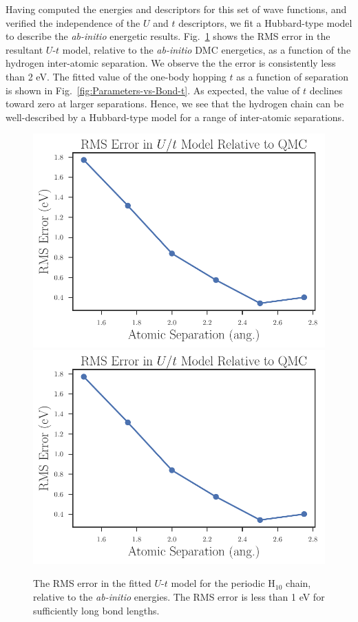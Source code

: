 Having computed the energies and descriptors for this set of wave functions, and verified the independence of the $U$ and $t$ descriptors, 
we fit a Hubbard-type model to describe the \textit{ab-initio} energetic results. 
Fig.~\ref{fig:RMS-Error-vs-Bond} shows the RMS error in the resultant $U$-$t$ model, relative to the \textit{ab-initio} DMC energetics, as a function of the hydrogen inter-atomic separation. 
We observe the the error is consistently less than 2 eV. The fitted value of the one-body hopping $t$ as a function of separation is shown in Fig.~\ref{fig:Parameters-vs-Bond-t}. 
As expected, the value of $t$ declines toward zero at larger separations. Hence, we see that the hydrogen chain can be well-described by a Hubbard-type model for a range of inter-atomic separations.

\begin{figure}
\centering
\includegraphics[scale=0.5]{./Figures/rms_ut_error_vs_separation_h_chain.pdf}
\includegraphics[scale=0.5]{./Figures/rms_ut_error_vs_separation_h_chain.pdf}
\caption{The RMS error in the fitted $U$-$t$ model for the periodic H$_{10}$ chain, relative to the \textit{ab-initio} energies. The RMS error is less than 1 eV for sufficiently long bond lengths.}\label{fig:RMS-Error-vs-Bond}
\end{figure}
 
